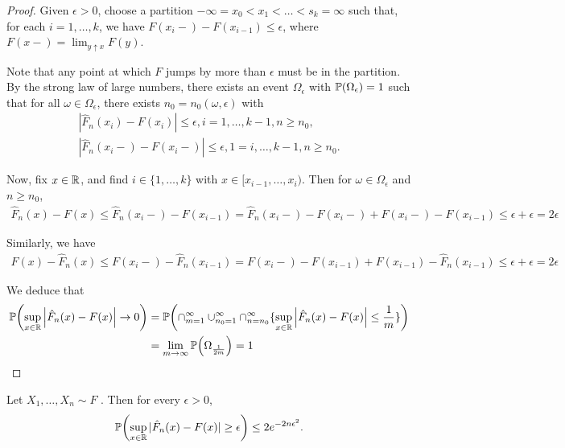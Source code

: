 \begin{proof}
  Given $\epsilon > 0$, choose a partition $-\infty = x_{0} < x_{1} <
  \dots < s_{k} = \infty$ such that, for each $i = 1, \dots, k$, we
  have $F(x_{i}-) - F(x_{i-1}) \leq \epsilon$, where $F(x-) = \lim_{y
    \uparrow x} F(y)$.

  Note that any point at which $F$ jumps by more than $\epsilon$ must
  be in the partition.  By the strong law of large numbers, there
  exists an event $\Omega_{\epsilon}$ with $\Prob{\Omega_{\epsilon}} =
  1$ such that for all $\omega \in \Omega_{\epsilon}$, there exists
  $n_{0} = n_{0}(\omega, \epsilon)$ with
  \begin{align}
    \label{eq:3}
    \left| \hat F_{n}(x_{i}) - F(x_{i}) \right| \leq \epsilon, i = 1,
    \dots, k - 1, n \geq n_{0}, \\
    \left| \hat F_{n}(x_{i}-) - F(x_{i}-) \right| \leq \epsilon, 1 =
    i, \dots, k-1, n \geq n_{0}.
  \end{align}

  Now, fix $x \in \mathbb{R}$, and find $i \in \{ 1, \dots, k \}$ with $x \in
  [x_{i-1}, \dots, x_{i})$.  Then for $\omega \in \Omega_{\epsilon}$
  and $n \geq n_{0}$,
  \begin{align}
    \label{eq:4}
    \hat F_{n}(x) - F(x) \leq \hat F_{n}(x_{i}-) - F(x_{i-1}) = \hat
    F_{n}(x_{i}-) - F(x_{i}-) + F(x_{i}-) - F(x_{i-1}) \leq \epsilon +
    \epsilon = 2\epsilon
  \end{align}

  Similarly, we have
  \begin{align}
    \label{eq:5}
    F(x) - \hat F_{n}(x) \leq F(x_{i}-) - \hat F_{n}(x_{i-1}) =
    F(x_{i}-) - F(x_{i-1}) + F(x_{i-1}) - \hat F_{n}(x_{i-1}) \leq
    \epsilon + \epsilon = 2 \epsilon
  \end{align}

  We deduce that
  \begin{align}
    \label{eq:6}
    \Prob{\sup_{x \in \R} \left| \hat F_{n}(x) - F(x) \right|
    \rightarrow 0} &= \Prob{\cap_{m=1}^{\infty} \cup_{n_{0} =
      1}^{\infty} \cap_{n=n_{0}}^{\infty} \{ \sup_{x \in \R} \left|
      \hat F_{n}(x) - F(x) \right| \leq \frac{1}{m} \}} \\
  &= \lim_{m \rightarrow \infty} \Prob{\Omega_{\frac{1}{2m}}} = 1
\end{align}
\end{proof}

\begin{thm}
  \label{defn:Introduction:1}
  Let $X_{1}, \dots, X_{n} \sim F$ \iid.  Then for every $\epsilon >
  0$,
  \begin{align}
    \label{eq:7}
    \Prob{\sup_{x \in \R}|\hat F_{n}(x) - F(x)| \geq \epsilon} \leq 2 e^{-2n\epsilon^{2}}.
  \end{align}
\end{thm}

